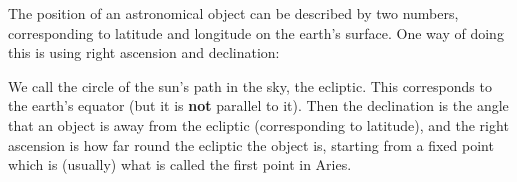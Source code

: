 The position of an astronomical object can be described by two numbers, corresponding
to latitude and longitude on the earth's surface. One way of doing this is using
right ascension and declination:
\par
We call the circle of the sun's path in the sky, the ecliptic. This corresponds to the
earth's equator (but it is \textbf{not} parallel to it). Then the declination is the 
angle that an object is away from the ecliptic (corresponding to latitude), and
the right ascension is how far round the ecliptic the object is, starting from
a fixed point which is (usually) what is called the first point in Aries.